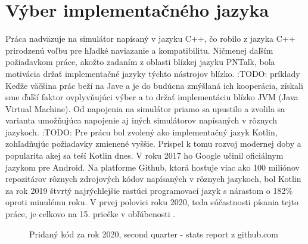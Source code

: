 \section{Výber implementačného jazyka}

Práca nadväzuje na simulátor napísaný v jazyku C++, čo robilo z jazyka C++ prirodzenú voľbu pre hľadké naviazanie a kompatibilitu. Ničmenej ďaľším požiadavkom práce, akožto zadaním z oblasti blízkej jazyku PNTalk, bola motivácia držať implementačné jazyky týchto nástrojov blízko. :TODO: príklady Keďže väčšina prác beží na Jave a je do budúcna zmýšlaná ich kooperácia, získali sme ďaľší faktor ovplyvňujúci výber a to držať implementáciu blízko JVM (Java Virtual Machine). Od napojenia na simulátor priamo sa upustilo a zvolila sa varianta umožňujúca napojenie aj iných simulátorov napísaných v rôznych jazykoch. :TODO: Pre prácu bol zvolený ako implementačný jazyk Kotlin, zohľadňujúc požiadavky zmienené vyššie. Prispel k tomu rozvoj modernej doby a popularita akej sa teší Kotlin dnes. V roku 2017 ho Google učinil oficiálnym jazykom pre Android. \cite{tornadofx} Na platforme Github, ktorá hosťuje viac ako 100 miliónov repozitárov rôznych zdrojových kódov napísaných v rôznych jazykoch, bol Kotlin za rok 2019 štvrtý najrýchlejšie rastúci programovací jazyk s nárastom o 182\% oproti minulému roku. \cite{githuboctoverse}
V prvej polovici roku 2020, teda súčastnosti písania tejto práce, je celkovo na 15. priečke v obľúbenosti \cite{githubstats}.

\begin{figure} [H]
	\label{chart:githubuse}
	\centering
	\caption{Pridaný kód za rok 2020, second quarter - stats report z github.com \cite{githuboctoverse}}
\end{figure}

